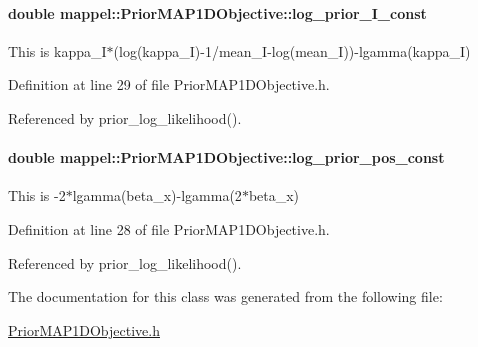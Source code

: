 \paragraph[{\texorpdfstring{log\+\_\+prior\+\_\+\+I\+\_\+const}{log_prior_I_const}}]{\setlength{\rightskip}{0pt plus 5cm}double mappel\+::\+Prior\+M\+A\+P1\+D\+Objective\+::log\+\_\+prior\+\_\+\+I\+\_\+const\hspace{0.3cm}{\ttfamily [protected]}}\hypertarget{classmappel_1_1PriorMAP1DObjective_a1cd270ee031e90604e7be0ddcce86026}{}\label{classmappel_1_1PriorMAP1DObjective_a1cd270ee031e90604e7be0ddcce86026}
This is kappa\+\_\+\+I$\ast$(log(kappa\+\_\+\+I)-\/1/mean\+\_\+\+I-\/log(mean\+\_\+I))-\/lgamma(kappa\+\_\+I) 

Definition at line 29 of file Prior\+M\+A\+P1\+D\+Objective.\+h.



Referenced by prior\+\_\+log\+\_\+likelihood().

\paragraph[{\texorpdfstring{log\+\_\+prior\+\_\+pos\+\_\+const}{log_prior_pos_const}}]{\setlength{\rightskip}{0pt plus 5cm}double mappel\+::\+Prior\+M\+A\+P1\+D\+Objective\+::log\+\_\+prior\+\_\+pos\+\_\+const\hspace{0.3cm}{\ttfamily [protected]}}\hypertarget{classmappel_1_1PriorMAP1DObjective_a9a1ba969ca0a2cd0a4eba7b4ae34156d}{}\label{classmappel_1_1PriorMAP1DObjective_a9a1ba969ca0a2cd0a4eba7b4ae34156d}
This is -\/2$\ast$lgamma(beta\+\_\+x)-\/lgamma(2$\ast$beta\+\_\+x) 

Definition at line 28 of file Prior\+M\+A\+P1\+D\+Objective.\+h.



Referenced by prior\+\_\+log\+\_\+likelihood().



The documentation for this class was generated from the following file\+:\begin{DoxyCompactItemize}
\item 
\hyperlink{PriorMAP1DObjective_8h}{Prior\+M\+A\+P1\+D\+Objective.\+h}\end{DoxyCompactItemize}
